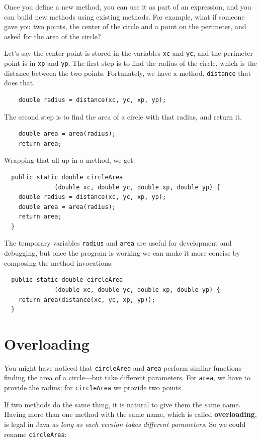 \documentclass[12pt]{book}
\theoremstyle{exercise}
\begin{document}
Once you define a new method,
you can use it as part of an expression, and you can build
new methods using existing methods.  For example, what if someone
gave you two points, the center of the circle and a point on
the perimeter, and asked for the area of the circle?

Let's say the center point is stored in the variables {\tt xc}
and {\tt yc}, and the perimeter point is in {\tt xp} and
{\tt yp}.  The first step is to find the radius of the circle, which
is the distance between the two points.  Fortunately, we have
a method, {\tt distance} that does that.

\begin{lstlisting}
    double radius = distance(xc, yc, xp, yp);
\end{lstlisting}
%
The second step is to find the area of a circle with that
radius, and return it.

\begin{lstlisting}
    double area = area(radius);
    return area;
\end{lstlisting}
%
Wrapping that all up in a method, we get:

\begin{lstlisting}
  public static double circleArea
              (double xc, double yc, double xp, double yp) {
    double radius = distance(xc, yc, xp, yp);
    double area = area(radius);
    return area;
  }
\end{lstlisting}
%
The temporary variables {\tt radius} and {\tt area} are
useful for development and debugging, but once the program is
working we can make it more concise by composing
the method invocations:

\begin{lstlisting}
  public static double circleArea
              (double xc, double yc, double xp, double yp) {
    return area(distance(xc, yc, xp, yp));
  }
\end{lstlisting}


\section{Overloading}
\label{overloading}

You might have noticed that {\tt circleArea}
and {\tt area} perform similar functions---finding
the area of a circle---but take different parameters.  For
{\tt area}, we have to provide the radius; for {\tt circleArea}
we provide two points.

If two methods do the same thing, it is natural to give them
the same name.
Having more than one method with the same name, which is called {\bf
overloading}, is legal in Java {\em as long as each version takes
different parameters}.  So we could rename {\tt circleArea}:
\end{document}
